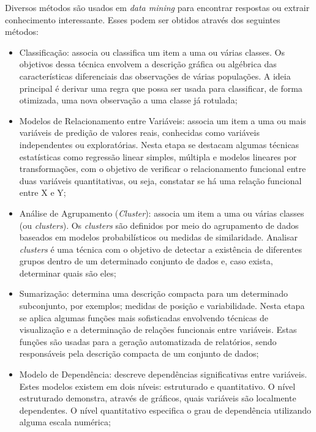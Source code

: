 Diversos métodos são usados em \textit{data mining} para encontrar respostas ou extrair conhecimento interessante. Esses podem ser obtidos através dos seguintes métodos:

\begin{itemize}
	\item Classificação: associa ou classifica um item a uma ou várias classes. Os objetivos dessa técnica envolvem a descrição gráfica ou algébrica das características diferenciais das observações de várias populações. A ideia principal é derivar uma regra que possa ser usada para classificar, de forma otimizada, uma nova observação a uma classe já rotulada;
	
	\item Modelos de Relacionamento entre Variáveis: associa um item a uma ou mais variáveis de predição de valores reais, conhecidas como variáveis independentes ou exploratórias. Nesta etapa se destacam algumas técnicas estatísticas como regressão linear simples, múltipla e modelos lineares por transformações, com o objetivo de verificar o relacionamento funcional entre duas variáveis quantitativas, ou seja, constatar se há uma relação funcional entre X e Y;
	
	\item Análise de Agrupamento (\textit{Cluster}): associa um item a uma ou várias classes (ou \textit{clusters}). Os \textit{clusters} são definidos por meio do agrupamento de dados baseados em modelos probabilísticos ou medidas de similaridade. Analisar \textit{clusters} é uma técnica com o objetivo de detectar a existência de diferentes grupos dentro de um determinado conjunto de dados e, caso exista, determinar quais são eles;
	
	\item Sumarização: determina uma descrição compacta para um determinado subconjunto, por exemplos; medidas de posição e variabilidade. Nesta etapa se aplica algumas funções mais sofisticadas envolvendo técnicas de visualização e a determinação de relações funcionais entre variáveis. Estas funções são usadas para a geração automatizada de relatórios, sendo responsáveis pela descrição compacta de um conjunto de dados;
	
	\item Modelo de Dependência: descreve dependências significativas entre variáveis. Estes modelos existem em dois níveis: estruturado e quantitativo. O nível estruturado demonstra, através de gráficos, quais variáveis são localmente dependentes. O nível quantitativo especifica o grau de dependência utilizando alguma escala numérica;
	

\end{itemize}
